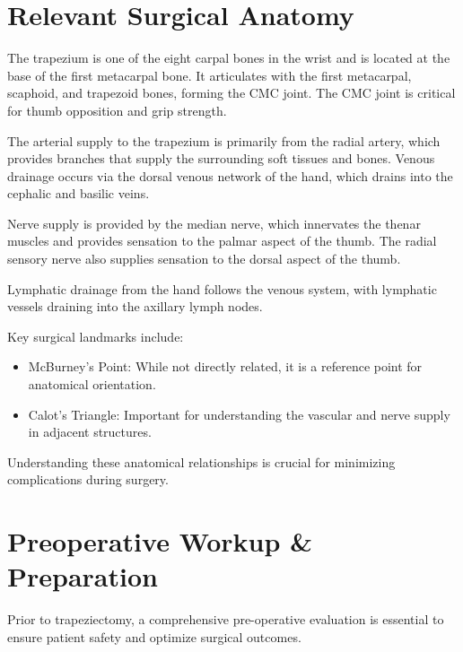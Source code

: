 \section*{Relevant Surgical Anatomy}
The trapezium is one of the eight carpal bones in the wrist and is located at the base of the first metacarpal bone. It articulates with the first metacarpal, scaphoid, and trapezoid bones, forming the CMC joint. The CMC joint is critical for thumb opposition and grip strength. 

The arterial supply to the trapezium is primarily from the radial artery, which provides branches that supply the surrounding soft tissues and bones. Venous drainage occurs via the dorsal venous network of the hand, which drains into the cephalic and basilic veins. 

Nerve supply is provided by the median nerve, which innervates the thenar muscles and provides sensation to the palmar aspect of the thumb. The radial sensory nerve also supplies sensation to the dorsal aspect of the thumb. 

Lymphatic drainage from the hand follows the venous system, with lymphatic vessels draining into the axillary lymph nodes. 

Key surgical landmarks include:

\begin{itemize}
  \item McBurney's Point: While not directly related, it is a reference point for anatomical orientation.
  \item Calot's Triangle: Important for understanding the vascular and nerve supply in adjacent structures.
\end{itemize}

Understanding these anatomical relationships is crucial for minimizing complications during surgery.

\section*{Preoperative Workup \& Preparation}
Prior to trapeziectomy, a comprehensive pre-operative evaluation is essential to ensure patient safety and optimize surgical outcomes.


